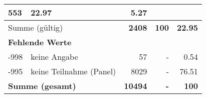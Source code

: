 \begin{longtable}{lXrrr}
       \num{553} &
       \num[round-mode=places,round-precision=2]{22,97} &
         \num[round-mode=places,round-precision=2]{5,27} \\
     \midrule
     \multicolumn{2}{l}{Summe (gültig)} &
       \textbf{\num{2408}} &
     \textbf{100} &
       \textbf{\num[round-mode=places,round-precision=2]{22,95}} \\
     \multicolumn{5}{l}{\textbf{Fehlende Werte}}\\
       -998 &
       keine Angabe &
         \num{57} &
        - &
         \num[round-mode=places,round-precision=2]{0,54} \\
       -995 &
       keine Teilnahme (Panel) &
         \num{8029} &
        - &
         \num[round-mode=places,round-precision=2]{76,51} \\
     \midrule
     \multicolumn{2}{l}{\textbf{Summe (gesamt)}} &
          \textbf{\num{10494}} &
        \textbf{-} &
        \textbf{100} \\
     \bottomrule
     \end{longtable}
     
